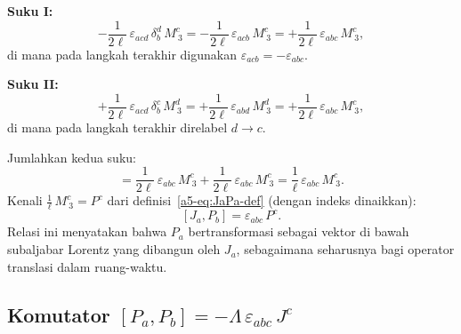 \vspace{0.5em}
\noindent \textbf{Suku I:}
\begin{equation}
    -\frac{1}{2\ell}\,\varepsilon_{acd}\,\delta^d_b\,M^c_{\ 3}
    = -\frac{1}{2\ell}\,\varepsilon_{acb}\,M^c_{\ 3}
    = +\frac{1}{2\ell}\,\varepsilon_{abc}\,M^c_{\ 3},
\end{equation}
di mana pada langkah terakhir digunakan $\varepsilon_{acb} = -\varepsilon_{abc}$.

\vspace{0.5em}
\noindent \textbf{Suku II:}
\begin{equation}
    +\frac{1}{2\ell}\,\varepsilon_{acd}\,\delta^c_b\,M^d_{\ 3}
    = +\frac{1}{2\ell}\,\varepsilon_{abd}\,M^d_{\ 3}
    = +\frac{1}{2\ell}\,\varepsilon_{abc}\,M^c_{\ 3},
\end{equation}
di mana pada langkah terakhir direlabel $d \to c$.

Jumlahkan kedua suku:
\begin{equation}
    [J_a, P_b] = \frac{1}{2\ell}\,\varepsilon_{abc}\,M^c_{\ 3} + \frac{1}{2\ell}\,\varepsilon_{abc}\,M^c_{\ 3}
    = \frac{1}{\ell}\,\varepsilon_{abc}\,M^c_{\ 3}.
\end{equation}
Kenali $\frac{1}{\ell}\,M^c_{\ 3} = P^c$ dari definisi~\eqref{a5-eq:JaPa-def} (dengan indeks dinaikkan):
\begin{equation}\label{a5-eq:JP-result}
    [J_a, P_b] = \varepsilon_{abc}\,P^c.
\end{equation}
Relasi ini menyatakan bahwa $P_a$ bertransformasi sebagai vektor di bawah subaljabar Lorentz yang dibangun oleh $J_a$, sebagaimana seharusnya bagi operator translasi dalam ruang-waktu.

\subsection{Komutator $[P_a, P_b] = -\Lambda\,\varepsilon_{abc}\,J^c$}

